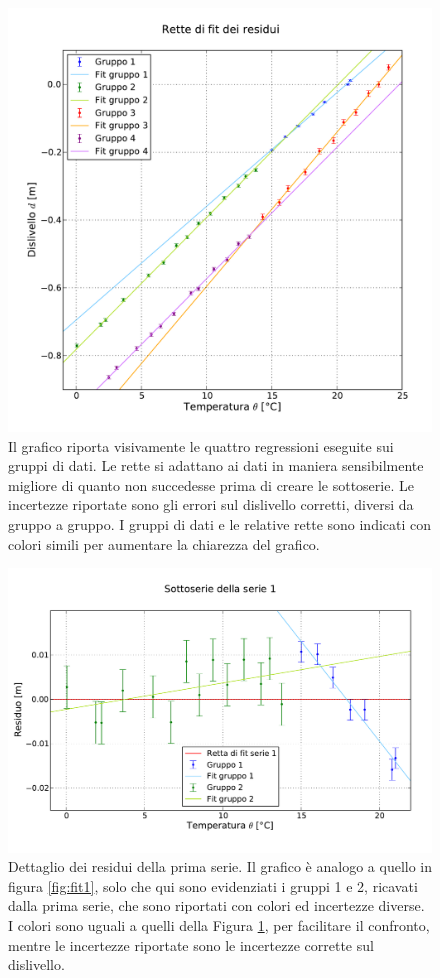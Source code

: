 \begin{figure}
    \centering
    \includegraphics[width=120mm]{immagini/residui.pdf}
    \caption{Il grafico riporta visivamente le quattro regressioni eseguite sui gruppi di dati.
    Le rette si adattano ai dati in maniera sensibilmente migliore di quanto non succedesse prima
    di creare le sottoserie. Le incertezze riportate sono gli errori sul dislivello corretti, diversi
    da gruppo a gruppo. I gruppi di dati e le relative rette sono indicati con colori simili per
    aumentare la chiarezza del grafico.}
    \label{fig:residui}
\end{figure}

\begin{figure}[p]
    \centering
    \includegraphics[width=130mm]{immagini/fit1r.pdf}
    \caption{Dettaglio dei residui della prima serie. Il grafico è analogo a quello in figura \ref{fig:fit1},
    solo che qui sono evidenziati i gruppi 1 e 2, ricavati dalla prima serie, che sono
    riportati con colori ed incertezze diverse. I colori sono uguali a quelli della Figura \ref{fig:residui},
    per facilitare il confronto, mentre le incertezze riportate sono le incertezze corrette sul dislivello.}
    \label{fig:fit1r}
\end{figure}

